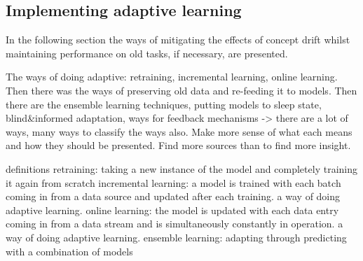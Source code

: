 


\subsection{Implementing adaptive learning}

In the following section the ways of mitigating the effects of concept drift whilst maintaining performance on old tasks, if necessary, are presented.

The ways of doing adaptive: retraining, incremental learning, online learning. Then there was the ways of preserving old data and re-feeding it to models. Then there are the ensemble learning techniques, putting models to sleep state, blind&informed adaptation, ways for feedback mechanisms
-> there are a lot of ways, many ways to classify the ways also. Make more sense of what each means and how they should be presented. Find more sources than \cite{conceptdriftsurvey} to find more insight.

definitions
 retraining: taking a new instance of the model and completely training it again from scratch
	    incremental learning: a model is trained with each batch coming in from a data source and updated after each training. a way of doing adaptive learning.
	    online learning: the model is updated with each data entry coming in from a data stream and is simultaneously constantly in operation. a way of doing adaptive learning.
	    ensemble learning: adapting through predicting with a combination of models


